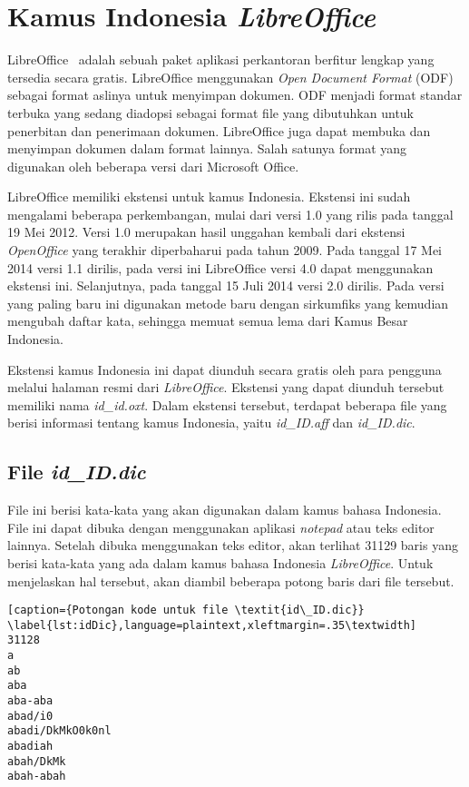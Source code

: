 \section{Kamus Indonesia \textit{LibreOffice}}
\label{sec:kamusindo}

LibreOffice~\cite{libreoffice} adalah sebuah paket aplikasi perkantoran berfitur lengkap yang tersedia secara gratis. LibreOffice menggunakan \textit{Open Document Format} (ODF) sebagai format aslinya untuk menyimpan dokumen. ODF menjadi format standar terbuka yang sedang diadopsi sebagai format file yang dibutuhkan untuk penerbitan dan penerimaan dokumen. LibreOffice juga dapat membuka dan menyimpan dokumen dalam format lainnya. Salah satunya format yang digunakan oleh beberapa versi dari Microsoft Office.

LibreOffice memiliki ekstensi untuk kamus Indonesia. Ekstensi ini sudah mengalami beberapa perkembangan, mulai dari versi 1.0 yang rilis pada tanggal 19 Mei 2012. Versi 1.0 merupakan hasil unggahan kembali dari ekstensi \textit{OpenOffice} yang terakhir diperbaharui pada tahun 2009. Pada tanggal 17 Mei 2014 versi 1.1 dirilis, pada versi ini LibreOffice versi 4.0 dapat menggunakan ekstensi ini. Selanjutnya, pada tanggal 15 Juli 2014 versi 2.0 dirilis. Pada versi yang paling baru ini digunakan metode baru dengan sirkumfiks yang kemudian mengubah daftar kata, sehingga memuat semua lema dari Kamus Besar Indonesia.

Ekstensi kamus Indonesia ini dapat diunduh secara gratis oleh para pengguna melalui halaman resmi dari \textit{LibreOffice}. Ekstensi yang dapat diunduh tersebut memiliki nama \textit{id\_id.oxt}. Dalam ekstensi tersebut, terdapat beberapa file yang berisi informasi tentang kamus Indonesia, yaitu \textit{id\_ID.aff} dan \textit{id\_ID.dic}.

\subsection{File \textit{id\_ID.dic}}

File ini berisi kata-kata yang akan digunakan dalam kamus bahasa Indonesia. File ini dapat dibuka dengan menggunakan aplikasi \textit{notepad} atau teks editor lainnya. Setelah dibuka menggunakan teks editor, akan terlihat 31129 baris yang berisi kata-kata yang ada dalam kamus bahasa Indonesia \textit{LibreOffice}. Untuk menjelaskan hal tersebut, akan diambil beberapa potong baris dari file tersebut.
	
	\begin{lstlisting}[caption={Potongan kode untuk file \textit{id\_ID.dic}}			\label{lst:idDic},language=plaintext,xleftmargin=.35\textwidth] 
31128
a
ab
aba
aba-aba
abad/i0
abadi/DkMkO0k0nl
abadiah
abah/DkMk
abah-abah
	\end{lstlisting}
	
